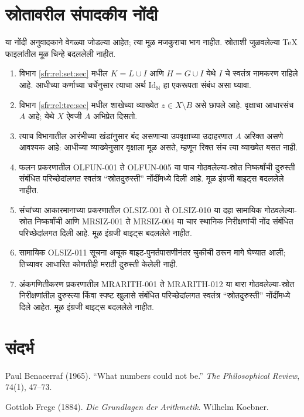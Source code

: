 \documentclass[11pt,a4paper,openany]{book}
\theoremstyle{definition}
\newcommand{\Nat}{\mathbb{N}}
\newcommand{\Id}[1]{\mathord{\mathrm{Id}_{#1}}}
\begin{document}
\chapter*{स्रोतावरील संपादकीय नोंदी}
या नोंदी अनुवादकाने वेगळ्या जोडल्या आहेत; त्या मूळ मजकुराचा भाग नाहीत.
स्रोताशी जुळवलेल्या TeX फाइलांतील मूळ चिन्हे बदललेली नाहीत.
\begin{enumerate}
\item विभाग \ref{sfr:rel:set:sec} मधील $K=L\cup I$ आणि $H=G\cup I$ येथे
$I$ चे स्वतंत्र नामकरण राहिले आहे. आधीच्या कर्णाच्या चर्चेनुसार त्याचा अर्थ
$\Id{\Nat}$ हा एकरूपता संबंध असा घ्यावा.
\item विभाग \ref{sfr:rel:tre:sec} मधील शाखेच्या व्याख्येत $z\in X\setminus B$
असे छापले आहे. वृक्षाचा आधारसंच $A$ आहे; येथे $X$ ऐवजी $A$ अभिप्रेत दिसतो.
\item त्याच विभागातील आरंभीच्या खंडांनुसार बंद असणाऱ्या उपवृक्षाच्या उदाहरणात
$A$ अरिक्त असणे आवश्यक आहे: आधीच्या व्याख्येनुसार वृक्षाला मूळ असते,
म्हणून रिक्त संच त्या व्याख्येत बसत नाही.
\item फलन प्रकरणातील OLFUN-001 ते OLFUN-005 या पाच
गोठवलेल्या-स्रोत निष्कर्षांची दुरुस्ती संबंधित परिच्छेदांलगत स्वतंत्र
``स्रोतदुरुस्ती'' नोंदींमध्ये दिली आहे. मूळ इंग्रजी बाइट्स बदललेले नाहीत.
\item संचांच्या आकारमानाच्या प्रकरणातील OLSIZ-001 ते OLSIZ-010
या दहा सामायिक गोठवलेल्या-स्रोत निष्कर्षांची आणि MRSIZ-001 ते MRSIZ-004
या चार स्थानिक निरीक्षणांची नोंद संबंधित परिच्छेदांलगत दिली आहे. मूळ
इंग्रजी बाइट्स बदललेले नाहीत.
\item सामायिक OLSIZ-011 सूचना अचूक बाइट-पुनर्तपासणीनंतर चुकीची ठरून
मागे घेण्यात आली; तिच्यावर आधारित कोणतीही मराठी दुरुस्ती केलेली नाही.
\item अंकगणितीकरण प्रकरणातील MRARITH-001 ते MRARITH-012 या बारा
गोठवलेल्या-स्रोत निरीक्षणांतील दुरुस्त्या किंवा स्पष्ट खुलासे संबंधित
परिच्छेदांलगत स्वतंत्र ``स्रोतदुरुस्ती'' नोंदींमध्ये दिले आहेत. मूळ
इंग्रजी बाइट्स बदललेले नाहीत.
\end{enumerate}
\chapter*{संदर्भ}
\label{bib:Benacerraf1965}
Paul Benacerraf (1965). ``What numbers could not be.''
\textit{The Philosophical Review}, 74(1), 47--73.

\par\medskip
Gottlob Frege (1884). \textit{Die Grundlagen der Arithmetik}.
Wilhelm Koebner.
\end{document}

